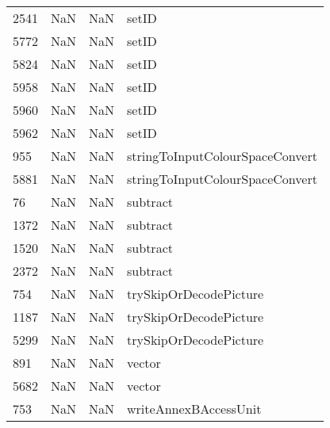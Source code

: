 \begin{tabular}{llll}
2541 &                   NaN &                        NaN &                                     setID \\
5772 &                   NaN &                        NaN &                                     setID \\
5824 &                   NaN &                        NaN &                                     setID \\
5958 &                   NaN &                        NaN &                                     setID \\
5960 &                   NaN &                        NaN &                                     setID \\
5962 &                   NaN &                        NaN &                                     setID \\
955  &                   NaN &                        NaN &           stringToInputColourSpaceConvert \\
5881 &                   NaN &                        NaN &           stringToInputColourSpaceConvert \\
76   &                   NaN &                        NaN &                                  subtract \\
1372 &                   NaN &                        NaN &                                  subtract \\
1520 &                   NaN &                        NaN &                                  subtract \\
2372 &                   NaN &                        NaN &                                  subtract \\
754  &                   NaN &                        NaN &                    trySkipOrDecodePicture \\
1187 &                   NaN &                        NaN &                    trySkipOrDecodePicture \\
5299 &                   NaN &                        NaN &                    trySkipOrDecodePicture \\
891  &                   NaN &                        NaN &                                    vector \\
5682 &                   NaN &                        NaN &                                    vector \\
753  &                   NaN &                        NaN &                     writeAnnexBAccessUnit \\

\end{tabular}
